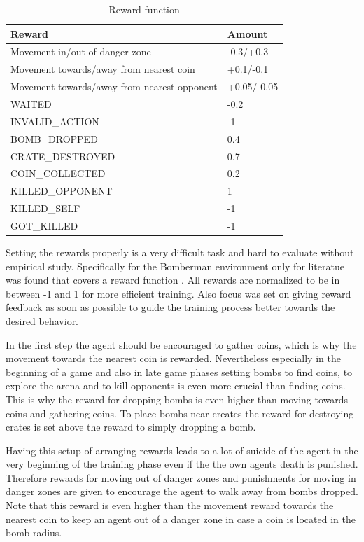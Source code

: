 \begin{table}[hbt!]
	\caption{Reward function}
	\label{tab:rewards}
	\begin{tabular}{|p{}|p{}|}
		\hline
		\textbf{Reward} & \textbf{Amount} \\ \hline
		Movement in/out of danger zone & -0.3/+0.3 \\ \hline
		Movement towards/away from nearest coin & +0.1/-0.1 \\ \hline
		Movement towards/away from nearest opponent & +0.05/-0.05 \\ \hline
		WAITED & -0.2 \\ \hline
		INVALID\_ACTION & -1 \\ \hline
		BOMB\_DROPPED & 0.4 \\ \hline
		CRATE\_DESTROYED & 0.7 \\ \hline
		COIN\_COLLECTED & 0.2 \\ \hline
		KILLED\_OPPONENT & 1 \\ \hline
		KILLED\_SELF & -1 \\ \hline
		GOT\_KILLED & -1 \\ \hline
	\end{tabular}
\end{table}

Setting the rewards properly is a very difficult task and hard to evaluate without empirical study. Specifically for the Bomberman environment only for literatue was found that covers a reward function \cite{Kormelink2018, Franca2019}. All rewards are normalized to be in between -1 and 1 for more efficient training. Also focus was set on giving reward feedback as soon as possible to guide the training process better towards the desired behavior. 

In the first step the agent should be encouraged to gather coins, which is why the movement towards the nearest coin is rewarded. Nevertheless especially in the beginning of a game and also in late game phases setting bombs to find coins, to explore the arena and to kill opponents is even more crucial than finding coins. This is why the reward for dropping bombs is even higher than moving towards coins and gathering coins. To place bombs near creates the reward for destroying crates is set above the reward to simply dropping a bomb. 

Having this setup of arranging rewards leads to a lot of suicide of the agent in the very beginning of the training phase even if the the own agents death is punished. Therefore rewards for moving out of danger zones and punishments for moving in danger zones are given to encourage the agent to walk away from bombs dropped. Note that this reward is even higher than the movement reward towards the nearest coin to keep an agent out of a danger zone in case a coin is located in the bomb radius. 

